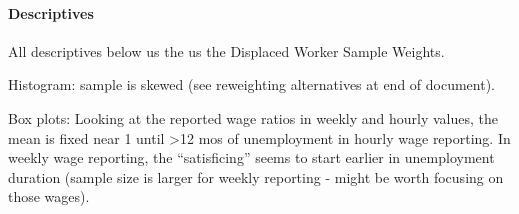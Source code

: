 \begin{Shaded}
\begin{Highlighting}[]
         \SpecialCharTok{\textgreater{}=}  \SpecialCharTok{\&}\SpecialCharTok{\textless{}=}  \SpecialCharTok{\&}\SpecialCharTok{\textless{}} \NormalTok{,}
         \SpecialCharTok{\textgreater{}=}  \SpecialCharTok{\&}\SpecialCharTok{\textless{}=}   \SpecialCharTok{\&}\SpecialCharTok{\textless{}} \NormalTok{,}
         \SpecialCharTok{\textgreater{}=}  \SpecialCharTok{\&}\SpecialCharTok{\textless{}=}  \SpecialCharTok{\&}\SpecialCharTok{\textless{}} \NormalTok{,}
         \SpecialCharTok{\textgreater{}=}  \SpecialCharTok{\&}\SpecialCharTok{\textless{}=}  \SpecialCharTok{\&}\SpecialCharTok{\textless{}} \NormalTok{,}
         \SpecialCharTok{\textgreater{}=}  \SpecialCharTok{\&}\SpecialCharTok{\textless{}=}  \SpecialCharTok{\&}\SpecialCharTok{\textless{}} \NormalTok{)}
\end{Highlighting}
\end{Shaded}

\paragraph{Descriptives}\label{descriptives}

All descriptives below us the us the Displaced Worker Sample Weights.

Histogram: sample is skewed (see reweighting alternatives at end of
document).

Box plots: Looking at the reported wage ratios in weekly and hourly
values, the mean is fixed near 1 until \textgreater12 mos of
unemployment in hourly wage reporting. In weekly wage reporting, the
``satisficing'' seems to start earlier in unemployment duration (sample
size is larger for weekly reporting - might be worth focusing on those
wages).

